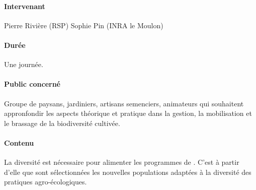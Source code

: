 \paragraph{Intervenant}
Pierre Rivière (RSP)
Sophie Pin (INRA le Moulon)

\paragraph{Durée}
Une journée.

\paragraph{Public concerné}
Groupe de paysans, jardiniers, artisans semenciers, animateurs qui souhaitent appronfondir les aspects théorique et pratique dans la gestion, la mobilisation et le brassage de la biodiversité cultivée.

\paragraph{Contenu}


La diversité est nécessaire pour alimenter les programmes de \SP. 
C'est à partir d'elle que sont sélectionnées les nouvelles populations adaptées à la diversité des pratiques agro-écologiques.

\descriptifFB


